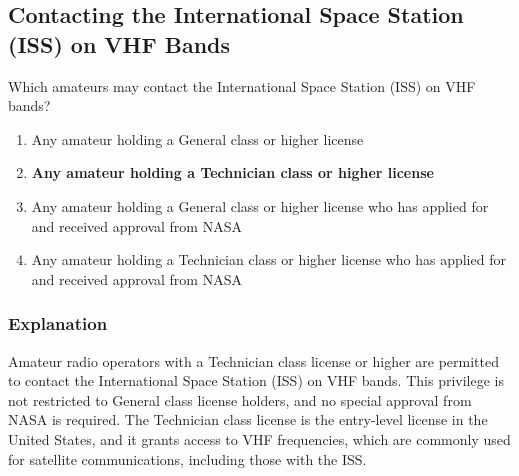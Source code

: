 \subsection{Contacting the International Space Station (ISS) on VHF Bands}
\label{T1B02}

\begin{tcolorbox}[colback=gray!10!white,colframe=black!75!black,title=T1B02]
Which amateurs may contact the International Space Station (ISS) on VHF bands?
\begin{enumerate}[label=\Alph*,noitemsep]
    \item Any amateur holding a General class or higher license
    \item \textbf{Any amateur holding a Technician class or higher license}
    \item Any amateur holding a General class or higher license who has applied for and received approval from NASA
    \item Any amateur holding a Technician class or higher license who has applied for and received approval from NASA
\end{enumerate}
\end{tcolorbox}

\subsubsection*{Explanation}
Amateur radio operators with a Technician class license or higher are permitted to contact the International Space Station (ISS) on VHF bands. This privilege is not restricted to General class license holders, and no special approval from NASA is required. The Technician class license is the entry-level license in the United States, and it grants access to VHF frequencies, which are commonly used for satellite communications, including those with the ISS.